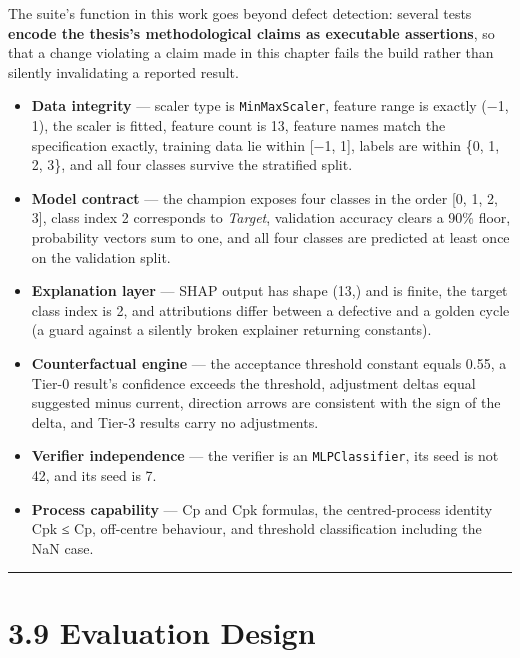 The suite's function in this work goes beyond defect detection: several tests \textbf{encode the thesis's methodological claims as executable assertions}, so that a change violating a claim made in this chapter fails the build rather than silently invalidating a reported result.

\begin{itemize}
\tightlist
\item
  \textbf{Data integrity} --- scaler type is \texttt{MinMaxScaler}, feature range is exactly (−1, 1), the scaler is fitted, feature count is 13, feature names match the specification exactly, training data lie within {[}−1, 1{]}, labels are within \{0, 1, 2, 3\}, and all four classes survive the stratified split.
\item
  \textbf{Model contract} --- the champion exposes four classes in the order {[}0, 1, 2, 3{]}, class index 2 corresponds to \emph{Target}, validation accuracy clears a 90\% floor, probability vectors sum to one, and all four classes are predicted at least once on the validation split.
\item
  \textbf{Explanation layer} --- SHAP output has shape (13,) and is finite, the target class index is 2, and attributions differ between a defective and a golden cycle (a guard against a silently broken explainer returning constants).
\item
  \textbf{Counterfactual engine} --- the acceptance threshold constant equals 0.55, a Tier-0 result's confidence exceeds the threshold, adjustment deltas equal suggested minus current, direction arrows are consistent with the sign of the delta, and Tier-3 results carry no adjustments.
\item
  \textbf{Verifier independence} --- the verifier is an \texttt{MLPClassifier}, its seed is not 42, and its seed is 7.
\item
  \textbf{Process capability} --- Cp and Cpk formulas, the centred-process identity Cpk ≤ Cp, off-centre behaviour, and threshold classification including the NaN case.
\end{itemize}

\begin{center}\rule{0.5\linewidth}{0.5pt}\end{center}

\hypertarget{evaluation-design}{%
\section{3.9 Evaluation Design}\label{evaluation-design}}

